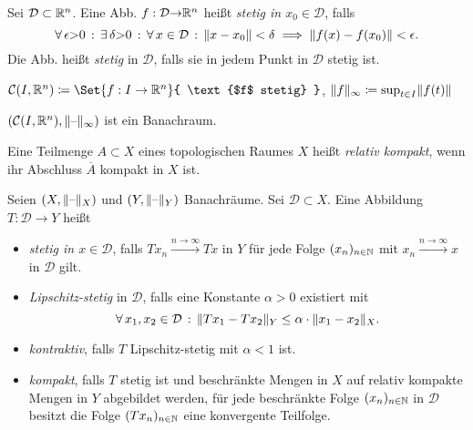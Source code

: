 \documentclass{cheat-sheet}
\newcommand{\D}{\mathcal{D}}
\begin{document}





\begin{defn}
  Sei $\D \subset \R^n$. Eine Abb. $f : \D {\to} \R^n$ heißt \emph{stetig in $x_0 \in \D$}, falls
  \[ \fa{\epsilon {>} 0} \ex{\delta {>} 0} \fa{x \in \D} \norm{x - x_0} < \delta \implies \norm{f(x) - f(x_0)} < \epsilon. \]
  Die Abb. heißt \emph{stetig} in $\D$, falls sie in jedem Punkt in $\D$ stetig ist.
\end{defn}

\begin{nota}
  $\mathcal{C}(I, \R^n) \coloneqq \Set{ f : I \to \R^n }{ \text{$f$ stetig} }$, $\lVert f\rVert_\infty \coloneqq \sup_{t \in I} \lVert f(t)\rVert$
\end{nota}


\begin{bem}
  $(\mathcal{C}(I, \mathbb{R}^n), \lVert\text{--}\rVert_\infty)$ ist ein Banachraum.
\end{bem}

\begin{defn}
  Eine Teilmenge $A \subset X$ eines topologischen Raumes $X$ heißt \emph{relativ kompakt}, wenn ihr Abschluss $\overline{A}$ kompakt in $X$ ist.
\end{defn}

\begin{defn}
  Seien $(X, \lVert\text{--}\rVert_X)$ und $(Y, \lVert\text{--}\rVert_Y)$ Banachräume. Sei $\D \subset X$. Eine Abbildung $T : \D \to Y$ heißt
  \begin{itemize}
    \item \emph{stetig in $x \in \D$}, falls $T x_n \xrightarrow{n \to \infty} T x$ in $Y$ für jede Folge $(x_n)_{n \in \mathbb{N}}$ mit $x_n \xrightarrow{n \to \infty} x$ in $\D$ gilt.
    \item \emph{Lipschitz-stetig} in $\D$, falls eine Konstante $\alpha > 0$ existiert mit
    \[ \fa{x_1, x_2 \in \D} \norm{Tx_1 - Tx_2}_Y \leq \alpha \cdot \norm{x_1 - x_2}_X. \]
    \item \emph{kontraktiv}, falls $T$ Lipschitz-stetig mit $\alpha < 1$ ist.
    \item \emph{kompakt}, falls $T$ stetig ist und beschränkte Mengen in $X$ auf relativ kompakte Mengen in $Y$ abgebildet werden, \dh{} für jede beschränkte Folge $(x_n)_{n \in \mathbb{N}}$ in $\D$ besitzt die Folge $(Tx_n)_{n \in \mathbb{N}}$ eine konvergente Teilfolge.
  \end{itemize}
\end{defn}
\end{document}
